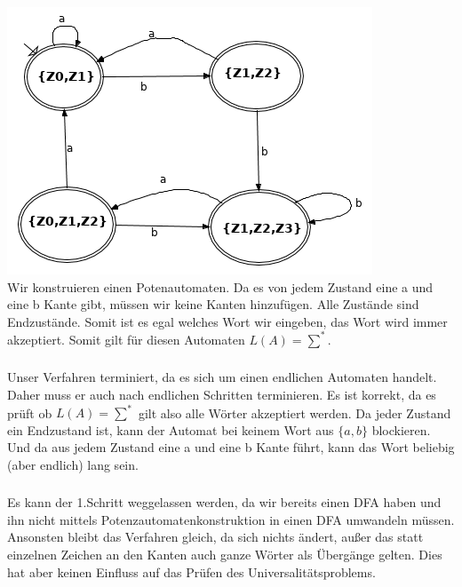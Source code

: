 \documentclass[a4paper,12pt]{scrartcl}
\begin{document}
\subsubsection{}
\includegraphics[scale=0.5]{152.png}\\
Wir konstruieren einen Potenautomaten. Da es von jedem Zustand eine a und eine b Kante gibt, müssen wir keine Kanten hinzufügen. Alle Zustände sind Endzustände. Somit ist es egal welches Wort wir eingeben, das Wort wird immer akzeptiert. Somit gilt für diesen Automaten $L(A)=\sum^{*}$.
\subsubsection{}
Unser Verfahren terminiert, da es sich um einen endlichen Automaten handelt. Daher muss er auch nach endlichen Schritten terminieren. Es ist korrekt, da es prüft ob $L(A)=\sum^{*}$ gilt also alle Wörter akzeptiert werden. Da jeder Zustand ein Endzustand ist, kann der Automat bei keinem Wort aus $\{a,b\}$ blockieren. Und da aus jedem Zustand eine a und eine b Kante führt, kann das Wort beliebig (aber endlich) lang sein.
\subsubsection{}
Es kann der 1.Schritt weggelassen werden, da wir bereits einen DFA haben und ihn nicht mittels Potenzautomatenkonstruktion in einen DFA umwandeln müssen. Ansonsten bleibt das Verfahren gleich, da sich nichts ändert, außer das statt einzelnen Zeichen an den Kanten auch ganze Wörter als Übergänge gelten. Dies hat aber keinen Einfluss auf das Prüfen des Universalitätsproblems.
\end{document}
